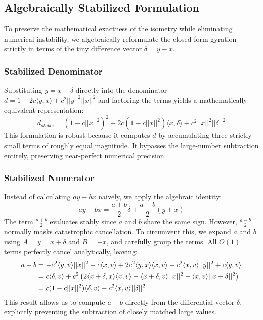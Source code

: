 \documentclass{article}
\begin{document}
\subsection*{Algebraically Stabilized Formulation}
To preserve the mathematical exactness of the isometry while eliminating numerical instability, we algebraically reformulate the closed-form gyration strictly in terms of the tiny difference vector $\delta = y - x$.

\subsubsection*{Stabilized Denominator}
Substituting $y = x + \delta$ directly into the denominator $d = 1 - 2 c \langle y, x \rangle + c^2 ||y||^2 ||x||^2$ and factoring the terms yields a mathematically equivalent representation:
\begin{equation}
    d_{stable} = (1 - c||x||^2)^2 - 2c(1 - c||x||^2)\langle x, \delta\rangle + c^2||x||^2 ||\delta||^2
\end{equation}
This formulation is robust because it computes $d$ by accumulating three strictly small terms of roughly equal magnitude. It bypasses the large-number subtraction entirely, preserving near-perfect numerical precision.

\subsubsection*{Stabilized Numerator}
Instead of calculating $a y - b x$ naively, we apply the algebraic identity:
\begin{equation}
    a y - b x = \frac{a+b}{2}\delta + \frac{a-b}{2}(y+x)
\end{equation}
The term $\frac{a+b}{2}$ evaluates stably since $a$ and $b$ share the same sign. However, $\frac{a-b}{2}$ normally masks catastrophic cancellation. To circumvent this, we expand $a$ and $b$ using $A = y = x + \delta$ and $B = -x$, and carefully group the terms. All $O(1)$ terms perfectly cancel analytically, leaving:
\begin{align}
    a - b &= -c^2 \langle y, v \rangle ||x||^2 - c \langle x, v \rangle + 2 c^2 \langle y, x \rangle \langle x, v \rangle - c^2 \langle x, v \rangle ||y||^2 + c \langle y, v \rangle \notag \\
    &= c \langle \delta, v \rangle + c^2 \left( 2 \langle x+\delta, x \rangle \langle x, v \rangle - \langle x+\delta, v \rangle ||x||^2 - \langle x, v \rangle ||x+\delta||^2 \right) \notag \\
    &= c (1 - c||x||^2) \langle \delta, v \rangle - c^2 \langle x, v \rangle ||\delta||^2
\end{align}
This result allows us to compute $a-b$ directly from the differential vector $\delta$, explicitly preventing the subtraction of closely matched large values.
\end{document}
